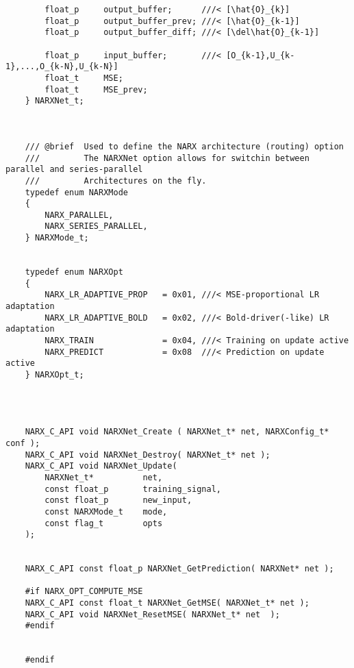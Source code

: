 \begin{lstlisting}
		float_p		output_buffer;		///< [\hat{O}_{k}]
		float_p		output_buffer_prev;	///< [\hat{O}_{k-1}]
		float_p		output_buffer_diff;	///< [\del\hat{O}_{k-1}]

		float_p		input_buffer;		///< [O_{k-1},U_{k-1},...,O_{k-N},U_{k-N}]
		float_t		MSE;
		float_t		MSE_prev;
	} NARXNet_t;



	/// @brief	Used to define the NARX architecture (routing) option
	///			The NARXNet option allows for switchin between parallel and series-parallel
	///			Architectures on the fly.
	typedef enum NARXMode
	{
		NARX_PARALLEL,
		NARX_SERIES_PARALLEL,
	} NARXMode_t;


	typedef enum NARXOpt
	{
		NARX_LR_ADAPTIVE_PROP	= 0x01,	///< MSE-proportional LR adaptation
		NARX_LR_ADAPTIVE_BOLD	= 0x02,	///< Bold-driver(-like) LR adaptation
		NARX_TRAIN				= 0x04,	///< Training on update active
		NARX_PREDICT			= 0x08	///< Prediction on update active
	} NARXOpt_t;




	NARX_C_API void NARXNet_Create ( NARXNet_t* net, NARXConfig_t*	conf );
	NARX_C_API void NARXNet_Destroy( NARXNet_t* net );
	NARX_C_API void NARXNet_Update(
		NARXNet_t*			net,
		const float_p		training_signal,
		const float_p		new_input,
		const NARXMode_t	mode,
		const flag_t		opts
	);


	NARX_C_API const float_p NARXNet_GetPrediction( NARXNet* net );

	#if NARX_OPT_COMPUTE_MSE
	NARX_C_API const float_t NARXNet_GetMSE( NARXNet_t* net );
	NARX_C_API void NARXNet_ResetMSE( NARXNet_t* net  );
	#endif


	#endif
\end{lstlisting}


